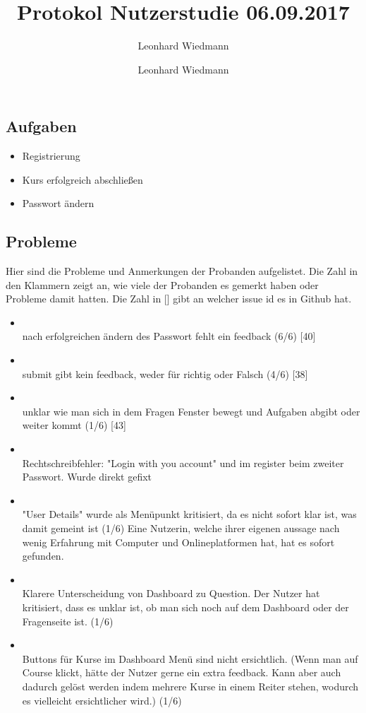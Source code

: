 \documentclass[colorback, accentcolor=tud1c, paper=a4]{tudexercise}
\title{Protokol Nutzerstudie 06.09.2017}
\subtitle{Leonhard Wiedmann}
\author{Leonhard Wiedmann}
\begin{document}
\maketitle
\subsection*{Aufgaben}
	\begin{itemize}
	\item Registrierung
  \item Kurs erfolgreich abschließen
  \item Passwort ändern
	\end{itemize}

\subsection*{Probleme}
  Hier sind die Probleme und Anmerkungen der Probanden aufgelistet. Die Zahl in den Klammern zeigt an, wie viele der Probanden es gemerkt haben oder Probleme damit hatten. Die Zahl in [] gibt an welcher issue id es in Github hat.
  \begin{itemize}
    \item \\ nach erfolgreichen ändern des Passwort fehlt ein feedback (6/6) [40]
		\item \\ submit gibt kein feedback, weder für richtig oder Falsch (4/6) [38]
		\item \\ unklar wie man sich in dem Fragen Fenster bewegt und Aufgaben abgibt oder weiter kommt (1/6) [43]
		\item \\ Rechtschreibfehler: "Login with you account" und im register beim zweiter Passwort. Wurde direkt gefixt
		\item \\ "User Details" wurde als Menüpunkt kritisiert, da es nicht sofort klar ist, was damit gemeint ist (1/6) {Eine Nutzerin, welche ihrer eigenen aussage nach wenig Erfahrung mit Computer und Onlineplatformen hat, hat es sofort gefunden. }
		\item \\ Klarere Unterscheidung von Dashboard zu Question. Der Nutzer hat kritisiert, dass es unklar ist, ob man sich noch auf dem Dashboard oder der Fragenseite ist. (1/6)
    \item \\ Buttons für Kurse im Dashboard Menü sind nicht ersichtlich. (Wenn man auf Course klickt, hätte der Nutzer gerne ein extra feedback. Kann aber auch dadurch gelöst werden indem mehrere Kurse in einem Reiter stehen, wodurch es vielleicht ersichtlicher wird.) (1/6) 
   \end{itemize}
\end{document}
